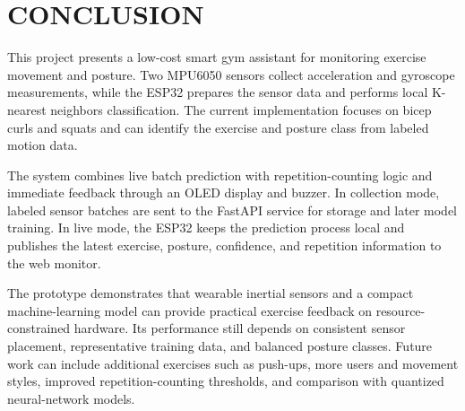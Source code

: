\chapter{CONCLUSION}

This project presents a low-cost smart gym assistant for monitoring exercise movement and posture. Two MPU6050 sensors collect acceleration and gyroscope measurements, while the ESP32 prepares the sensor data and performs local K-nearest neighbors classification. The current implementation focuses on bicep curls and squats and can identify the exercise and posture class from labeled motion data.

The system combines live batch prediction with repetition-counting logic and immediate feedback through an OLED display and buzzer. In collection mode, labeled sensor batches are sent to the FastAPI service for storage and later model training. In live mode, the ESP32 keeps the prediction process local and publishes the latest exercise, posture, confidence, and repetition information to the web monitor.

The prototype demonstrates that wearable inertial sensors and a compact machine-learning model can provide practical exercise feedback on resource-constrained hardware. Its performance still depends on consistent sensor placement, representative training data, and balanced posture classes. Future work can include additional exercises such as push-ups, more users and movement styles, improved repetition-counting thresholds, and comparison with quantized neural-network models.
